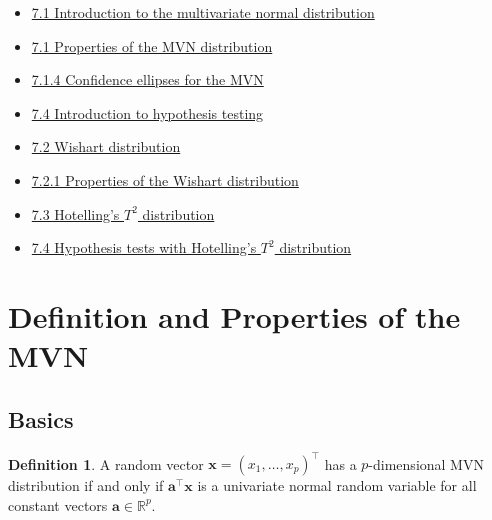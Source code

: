 \documentclass[
]{book}
\providecommand{\tightlist}{%
  \setlength{\itemsep}{0pt}\setlength{\parskip}{0pt}}
\theoremstyle{definition}
\newtheorem{definition}{Definition}[chapter]
\theoremstyle{definition}
\theoremstyle{definition}
\theoremstyle{definition}
\theoremstyle{remark}
\begin{document}
\begin{itemize}
\tightlist
\item
  \href{https://mediaspace.nottingham.ac.uk/media/Multivariate+Normal+Random+VariablesA+Introduction/1_pdjxphay}{7.1 Introduction to the multivariate normal distribution}
\item
  \href{https://mediaspace.nottingham.ac.uk/media/Multivariate+Normal+Random+VariablesA++Properties/1_j9mh4v7r}{7.1 Properties of the MVN distribution}
\item
  \href{https://mediaspace.nottingham.ac.uk/media/Multivariate+Normal+Random+VariablesA++Confidence+Ellipses/1_dlvgqoi3}{7.1.4 Confidence ellipses for the MVN}
\item
  \href{https://mediaspace.nottingham.ac.uk/media/MVN_HypothesistestIntro.mp4/1_b1gstf1h}{7.4 Introduction to hypothesis testing}
\item
  \href{https://mediaspace.nottingham.ac.uk/media/MVN_Wishart/1_3kpedgb6}{7.2 Wishart distribution}
\item
  \href{https://mediaspace.nottingham.ac.uk/media/MVN_WishartProperties/1_yfgzcsyb}{7.2.1 Properties of the Wishart distribution}
\item
  \href{https://mediaspace.nottingham.ac.uk/media/MVN_Hotelling.mp4/1_5evjeyu8}{7.3 Hotelling's \(T^2\) distribution}
\item
  \href{https://mediaspace.nottingham.ac.uk/media/Multivariate+NormalsA+Hypothesis+testing/1_bhk20k5z}{7.4 Hypothesis tests with Hotelling's \(T^2\) distribution}
\end{itemize}

\section{Definition and Properties of the MVN}\label{definition-and-properties-of-the-mvn}

\subsection{Basics}\label{basics}

\begin{definition}
\protect\hypertarget{def:mvn}{}\label{def:mvn}A random vector \(\mathbf x=(x_1, \ldots , x_p)^\top\) has a \(p\)-dimensional MVN distribution if and only if \(\mathbf a^\top \mathbf x\) is a univariate normal random variable for all constant vectors \(\mathbf a\in \mathbb{R}^p\).
\end{definition}
\end{document}
